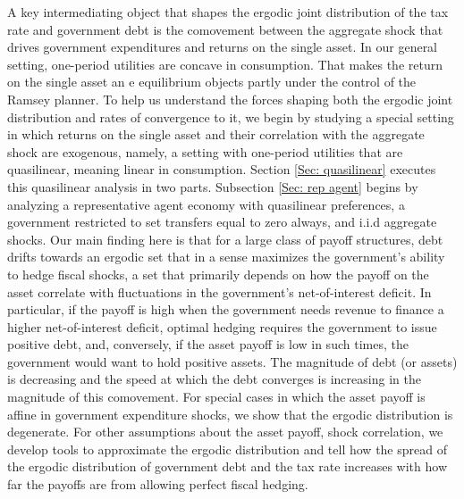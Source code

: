 \documentclass[thmsb,11pt]{article}
\begin{document}
A key intermediating object that shapes the ergodic joint distribution of the tax rate and government debt is the comovement between the aggregate shock that drives government expenditures and returns
on the single asset.  In our general setting, one-period utilities are concave in consumption. That makes  the return on the single asset an e equilibrium objects partly under the control of the Ramsey planner. 
 To help us understand the forces shaping both the ergodic joint distribution and rates of convergence to it,  we begin by 
studying a special setting in which returns on the single asset and their correlation with the aggregate shock are exogenous, namely,
a setting with one-period utilities  that are quasilinear, meaning linear in consumption.  
Section \ref{Sec: quasilinear} executes this quasilinear  analysis in two parts.  
Subsection \ref{Sec: rep agent} begins by analyzing
a representative agent economy with quasilinear preferences, a government restricted to set transfers equal to zero always, and i.i.d aggregate shocks.
  Our main finding here is  that for a large class of payoff structures,
debt  drifts towards an ergodic set that in a sense maximizes the  government's ability to hedge fiscal shocks,  a set
that  primarily depends on how the payoff on the asset  correlate with  fluctuations in the
 government's net-of-interest deficit. In particular, if the  payoff  is  high when the government
 needs revenue to finance a higher net-of-interest deficit, optimal hedging requires the government to issue positive debt, and, conversely, if the
  asset payoff is low in such times, the government would want to hold positive assets.
   The magnitude of debt (or assets) is decreasing and the speed at which the debt converges is increasing in the magnitude of this comovement.
For special cases in which the asset payoff is affine in government expenditure shocks, we
show that the ergodic distribution is degenerate. For other assumptions about the asset payoff, shock correlation, we develop tools to approximate the ergodic distribution
 and tell  how the spread of the ergodic distribution of government  debt and the tax rate increases with how far the payoffs  are from allowing perfect fiscal hedging. 
 
\end{document}
